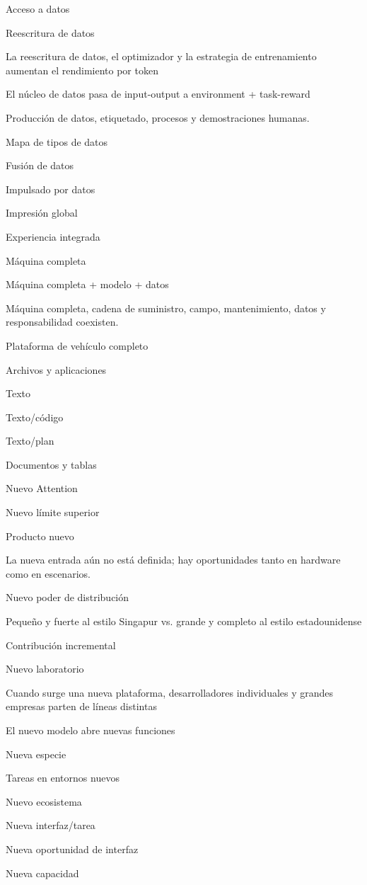 \documentclass{article}
\begin{document}
Acceso a datos

Reescritura de datos

La reescritura de datos, el optimizador y la estrategia de entrenamiento aumentan el rendimiento por token

El núcleo de datos pasa de input-output a environment + task-reward

Producción de datos, etiquetado, procesos y demostraciones humanas.

Mapa de tipos de datos

Fusión de datos

Impulsado por datos

Impresión global

Experiencia integrada

Máquina completa

Máquina completa + modelo + datos

Máquina completa, cadena de suministro, campo, mantenimiento, datos y responsabilidad coexisten.

Plataforma de vehículo completo

Archivos y aplicaciones

Texto

Texto/código

Texto/plan

Documentos y tablas

Nuevo Attention

Nuevo límite superior

Producto nuevo

La nueva entrada aún no está definida; hay oportunidades tanto en hardware como en escenarios.

Nuevo poder de distribución

Pequeño y fuerte al estilo Singapur vs. grande y completo al estilo estadounidense

Contribución incremental

Nuevo laboratorio

Cuando surge una nueva plataforma, desarrolladores individuales y grandes empresas parten de líneas distintas

El nuevo modelo abre nuevas funciones

Nueva especie

Tareas en entornos nuevos

Nuevo ecosistema

Nueva interfaz/tarea

Nueva oportunidad de interfaz

Nueva capacidad
\end{document}
